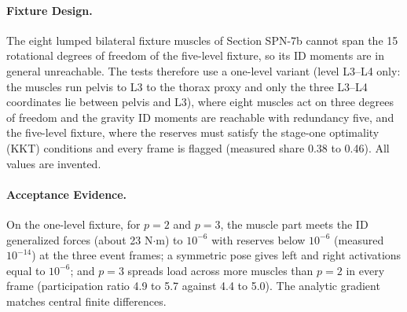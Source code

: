 \paragraph{Fixture Design.}
The eight lumped bilateral fixture muscles of Section SPN-7b cannot span the 15
rotational degrees of freedom of the five-level fixture, so its ID moments
are in general unreachable. The tests therefore use a one-level variant
(level L3--L4 only: the muscles run pelvis to L3 to the thorax proxy and only
the three L3--L4 coordinates lie between pelvis and L3), where eight muscles
act on three degrees of freedom and the gravity ID moments are reachable with
redundancy five, and the five-level fixture, where the reserves must satisfy
the stage-one optimality (KKT) conditions and every frame is flagged
(measured share 0.38 to 0.46). All values are invented.

\paragraph{Acceptance Evidence.}
On the one-level fixture, for $p=2$ and $p=3$, the muscle part meets the ID
generalized forces (about 23 N$\cdot$m) to $10^{-6}$ with reserves below
$10^{-6}$ (measured $10^{-14}$) at the three event frames; a symmetric pose
gives left and right activations equal to $10^{-6}$; and $p=3$ spreads load
across more muscles than $p=2$ in every frame (participation ratio 4.9 to 5.7
against 4.4 to 5.0). The analytic gradient matches central finite differences.


